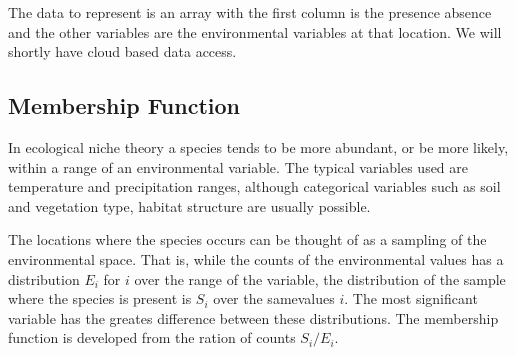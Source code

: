 \documentclass{article}
\begin{document}
The data to represent is an array with the first column is the presence absence and the other variables are the environmental variables at that location.  We will shortly have cloud based data access.  

\subsection{Membership Function}

In ecological niche theory a species tends to be more abundant, or be more likely,  within a range of an environmental variable.  The typical variables used are temperature  and precipitation ranges, although categorical variables such as soil and vegetation type, habitat structure are usually possible.  

The locations where the species occurs can be thought of as a sampling of the environmental space.  That is, while the counts of the environmental values has a distribution $E_i$ for $i$ over the range of the variable, the distribution of the sample where the species is present is $S_i$ over the samevalues $i$.  The most significant variable has the greates difference between these distributions.  The membership function is developed from the ration of counts   $S_i/E_i$. 
\end{document}
